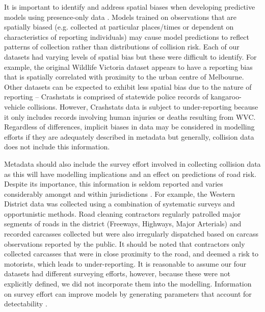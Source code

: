 It is important to identify and address spatial biases when developing predictive models using presence-only data \citep{kram13}. Models trained on observations that are spatially biased (e.g. collected at particular places/times or dependent on characteristics of reporting individuals) may cause model predictions to reflect patterns of collection rather than distributions of collision risk. Each of our datasets had varying levels of spatial bias but these were difficult to identify. For example, the original Wildlife Victoria dataset appears to have a reporting bias that is spatially correlated with proximity to the urban centre of Melbourne. Other datasets can be expected to exhibit less spatial bias due to the nature of reporting -- Crashstats is comprised of statewide police records of kangaroo-vehicle collisions. However, Crashstats data is subject to under-reporting because it only includes records involving human injuries or deaths resulting from WVC.  Regardless of differences, implicit biases in data may be considered in modelling efforts if they are adequately described in metadata \citep{wart13} but generally, collision data does not include this information.

Metadata should also include the survey effort involved in collecting collision data as this will have modelling implications and an effect on predictions of road risk. Despite its importance, this information is seldom reported and varies considerably amongst and within jurisdictions \citep{huij07a}. For example, the Western District data was collected using a combination of systematic surveys and opportunistic methods. Road cleaning contractors regularly patrolled major segments of roads in the district (Freeways, Highways, Major Arterials) and recorded carcasses collected but were also irregularly dispatched based on carcass observations reported by the public. It should be noted that contractors only collected carcasses that were in close proximity to the road, and deemed a risk to motorists, which leads to under-reporting. It is reasonable to assume our four datasets had different surveying efforts, however, because these were not explicitly defined, we did not incorporate them into the modelling. Information on survey effort can improve models by generating parameters that account for detectability \citep{dora14}.

